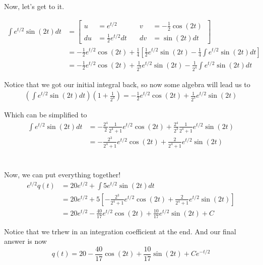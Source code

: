Now, let's get to it.

\begin{align*}
    \int e^{t/2} \sin(2t) dt &= 
    \left[
      \begin{alignedat}{2}
      u  &= e^{t/2}               \quad & v  &= -\frac{1}{2}\cos(2t) \\
      du &= \frac{1}{2}e^{t/2}dt  \quad & dv &= \sin(2t) dt 
      \end{alignedat}\,
    \right] \\
    &=
    -\frac{1}{2}e^{t/2}\cos(2t) + \frac{1}{4} \left[ 
        \frac{1}{2}e^{t/2}\sin(2t) - \frac{1}{4} \int e^{t/2} \sin(2t) dt
    \right] \\
    &= -\frac{1}{2}e^{t/2}\cos(2t) + \frac{1}{2^3} e^{t/2}\sin(2t)
      - \frac{1}{2^4} \int e^{t/2}\sin(2t) dt
\end{align*}

Notice that we got our initial integral back, so now some algebra will lead us to
\begin{align*}
\left( \int e^{t/2}\sin(2t) dt \right) \left(1 + \frac{1}{2^4} \right) =
-\frac{1}{2}e^{t/2}\cos(2t) + \frac{1}{2^3} e^{t/2}\sin(2t)
\end{align*}

Which can be simplified to
\begin{align*}
\int e^{t/2}\sin(2t) dt   &=
-\frac{2^4}{2}\frac{1}{2^4+1} e^{t/2}\cos(2t) + \frac{2^4}{2^3}\frac{1}{2^4+1} e^{t/2}\sin(2t) \\
&= -\frac{2^3}{2^4+1}e^{t/2}\cos(2t) + \frac{2}{2^4+1} e^{t/2}\sin(2t)
\end{align*}
\\~\\

Now, we can put everything together!
\begin{align*}
e^{t/2} q(t) &= 20 e^{t/2} + \int 5 e^{t/2} \sin(2t) dt \\
&= 20 e^{t/2} + 5 \left[ -\frac{2^3}{2^4+1}e^{t/2}\cos(2t) + \frac{2}{2^4+1} e^{t/2}\sin(2t) \right] \\
&= 20 e^{t/2} -\frac{40}{17}e^{t/2}\cos(2t) + \frac{10}{17} e^{t/2}\sin(2t) + C
\end{align*}

Notice that we trhew in an integration coefficient at the end.
And our final answer is now
$$
q(t) =
20 -\frac{40}{17}\cos(2t) + \frac{10}{17} \sin(2t) + Ce^{-t/2}
$$